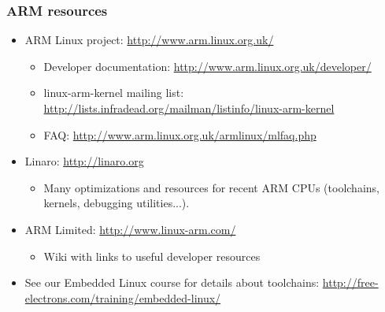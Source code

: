 \begin{frame}
  \frametitle{ARM resources}
  \begin{itemize}
  \item ARM Linux project: \url{http://www.arm.linux.org.uk/}
    \begin{itemize}
    \item Developer documentation:
      \url{http://www.arm.linux.org.uk/developer/}
    \item linux-arm-kernel mailing list:
      \url{http://lists.infradead.org/mailman/listinfo/linux-arm-kernel}
    \item FAQ: \url{http://www.arm.linux.org.uk/armlinux/mlfaq.php}
    \end{itemize}
  \item Linaro: \url{http://linaro.org}
    \begin{itemize}
    \item Many optimizations and resources for recent ARM CPUs
      (toolchains, kernels, debugging utilities...).
    \end{itemize}
  \item ARM Limited: \url{http://www.linux-arm.com/}
    \begin{itemize}
    \item Wiki with links to useful developer resources
    \end{itemize}
  \item See our Embedded Linux course for details about toolchains:
    {\small
     \url{http://free-electrons.com/training/embedded-linux/}}
  \end{itemize}
\end{frame}

